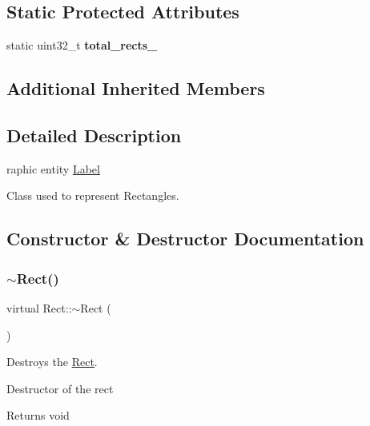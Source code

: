 \subsection*{Static Protected Attributes}
\begin{DoxyCompactItemize}
\item 
\mbox{\label{class_rect_a5fc34a318a2dde90d5a700b7649224d1}} 
static uint32\+\_\+t {\bfseries total\+\_\+rects\+\_\+}
\end{DoxyCompactItemize}
\subsection*{Additional Inherited Members}


\subsection{Detailed Description}
raphic entity \hyperlink{class_label}{Label} 

Class used to represent Rectangles. 

\subsection{Constructor \& Destructor Documentation}
\mbox{\label{class_rect_a46a2a29ee00ff71d28ccdf9b0f217be9}} 
\subsubsection{\texorpdfstring{$\sim$\+Rect()}{~Rect()}}
{\footnotesize\ttfamily virtual Rect\+::$\sim$\+Rect (\begin{DoxyParamCaption}{ }\end{DoxyParamCaption})\hspace{0.3cm}{\ttfamily [virtual]}}



Destroys the \hyperlink{class_rect}{Rect}. 

Destructor of the rect

\begin{DoxyReturn}{Returns}
void 
\end{DoxyReturn}
\mbox{\label{class_rect_a911e531b86de33734dd7de3456722115}} 
